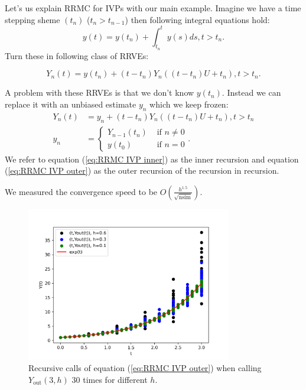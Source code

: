 \documentclass[a4paper,12pt]{article}
\begin{document}
\begin{example}[RRMC $y'=y$] \label{ex:RRMC IVP}
    Let's us explain RRMC for IVPs with our main example.
    Imagine we have a time stepping sheme $(t_{n})$ ($t_{n}> t_{n-1}$)
    then following integral equations hold:
    \begin{equation}
        y(t)= y(t_{n}) + \int_{t_{n}}^{t}y(s)ds , t>t_{n}.
    \end{equation}
    Turn these in following class of RRVEs:

    \begin{equation}
        Y_{n}(t) = y(t_{n}) + (t-t_{n})Y_{n}((t-t_{n})U+t_{n}), t>t_{n}.
    \end{equation}

    A problem with these RRVEs is that we don't know $y(t_{n})$.
    Instead we can replace it with an unbiased estimate $y_{n}$
    which we keep frozen:
    \begin{align}
        \label{eq:RRMC IVP inner}
        Y_{n}(t) & = y_{n} + (t-t_{n})Y_{n}((t-t_{n})U+t_{n}), t>t_{n} \\
        y_{n}    & = \begin{cases}
                         Y_{n-1}(t_{n}) & \text{ if } n \neq 0 \\
                         y(t_{0})       & \text{ if } n = 0
                     \end{cases}.
        \label{eq:RRMC IVP outer}
    \end{align}
    We refer to equation (\ref{eq:RRMC IVP inner}) as the inner recursion and
    equation (\ref{eq:RRMC IVP outer}) as the outer recursion of the recursion in
    recursion.
\end{example}

\begin{pythonn} \label{py:RRMC IVP}
    We measured the convergence speed to be $O\left(\frac{h^{1.5}}{\sqrt{\text{nsim}}}
        \right)$.

    \begin{figure}[h!]
        \centering
        \includegraphics[width=0.8\textwidth]{plots/RRMC IVP.png}
        \caption{Recursive calls of equation (\ref{eq:RRMC IVP outer})
            when calling $Y_{\text{out}}(3,h)$ $30$ times for different $h$.  }
        \label{fig:RRMC IVP}
    \end{figure}
\end{pythonn}
\end{document}
